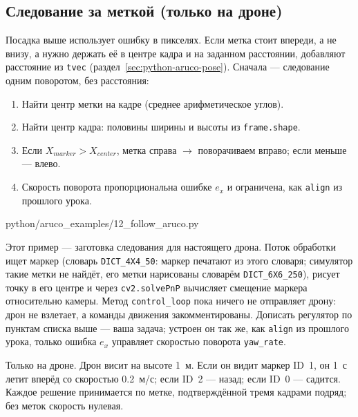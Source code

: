 \subsection{Следование за меткой (только на дроне)}

Посадка выше использует ошибку в пикселях. Если метка стоит впереди, а не внизу, а нужно держать её в центре кадра и на заданном расстоянии, добавляют расстояние из \verb|tvec| (раздел~\ref{sec:python-aruco-pose}). Сначала --- следование одним поворотом, без расстояния:
\begin{enumerate}
    \item Найти центр метки на кадре (среднее арифметическое углов).
    \item Найти центр кадра: половины ширины и высоты из \texttt{frame.shape}.
    \item Если $X_{marker} > X_{center}$, метка справа $\rightarrow$ поворачиваем вправо; если меньше --- влево.
    \item Скорость поворота пропорциональна ошибке $e_x$ и ограничена, как \verb|align| из прошлого урока.
\end{enumerate}

\begin{codefile}[python]{python/aruco_examples/12_follow_aruco.py}
\end{codefile}

Этот пример --- заготовка следования для настоящего дрона. Поток обработки ищет маркер (словарь \texttt{DICT\_4X4\_50}: маркер печатают из этого словаря; симулятор такие метки не найдёт, его метки нарисованы словарём \texttt{DICT\_6X6\_250}), рисует точку в его центре и через \texttt{cv2.solvePnP} вычисляет смещение маркера относительно камеры. Метод \texttt{control\_loop} пока ничего не отправляет дрону: дрон не взлетает, а команды движения закомментированы. Дописать регулятор по пунктам списка выше --- ваша задача; устроен он так же, как \verb|align| из прошлого урока, только ошибка $e_x$ управляет скоростью поворота \verb|yaw_rate|.

\begin{taskbox}
Только на дроне. Дрон висит на высоте 1~м. Если он видит маркер ID~1, он 1~с летит вперёд со скоростью 0.2~м/с; если ID~2 --- назад; если ID~0 --- садится. Каждое решение принимается по метке, подтверждённой тремя кадрами подряд; без меток скорость нулевая.
\end{taskbox}
